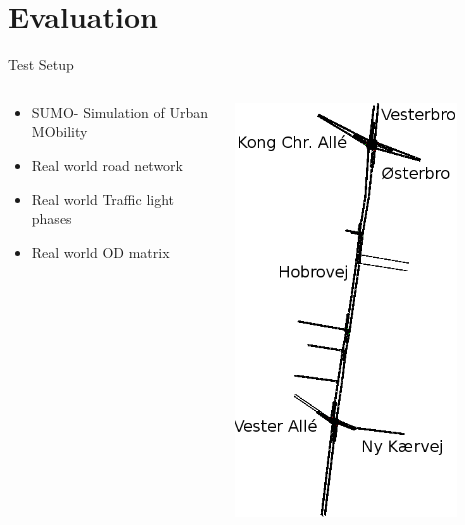 

\section{Evaluation}
\begin{frame}{Test Setup}

\begin{columns}
	\begin{column}{0.7\textwidth}
		\begin{itemize}
		\item SUMO- Simulation of Urban MObility\\
		\item Real world road network\\
		\item Real world Traffic light phases\\
		\item Real world OD matrix\\
		\end{itemize}
	\end{column}

	\begin{column}{0.3\textwidth}
		\includegraphics[width=0.8\textwidth]{images/Hobrovej.png}
	\end{column}
\end{columns}
\end{frame}

